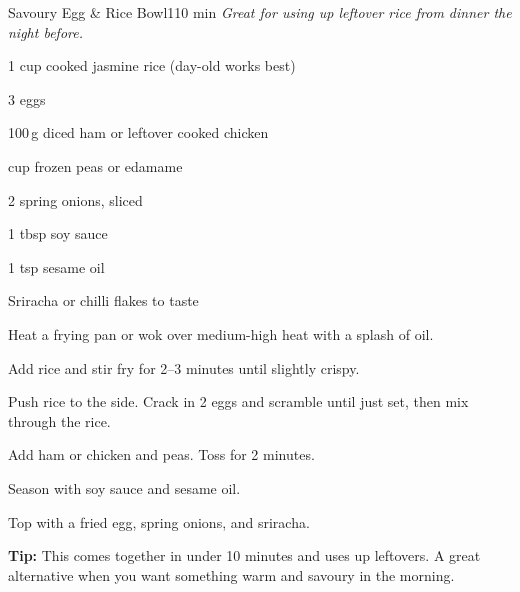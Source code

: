 \begin{recipebox}{Savoury Egg \& Rice Bowl}{1}{10 min}
\textit{Great for using up leftover rice from dinner the night before.}

\begin{ingredients}
  \item 1 cup cooked jasmine rice (day-old works best)
  \item 3 eggs
  \item 100\,g diced ham or leftover cooked chicken
  \item \textonehalf{} cup frozen peas or edamame
  \item 2 spring onions, sliced
  \item 1 tbsp soy sauce
  \item 1 tsp sesame oil
  \item Sriracha or chilli flakes to taste
\end{ingredients}

\begin{method}
  \item Heat a frying pan or wok over medium-high heat with a splash of oil.
  \item Add rice and stir fry for 2--3 minutes until slightly crispy.
  \item Push rice to the side. Crack in 2 eggs and scramble until just set, then mix through the rice.
  \item Add ham or chicken and peas. Toss for 2 minutes.
  \item Season with soy sauce and sesame oil.
  \item Top with a fried egg, spring onions, and sriracha.
\end{method}

\begin{notelist}
  \item \textbf{Tip:} This comes together in under 10 minutes and uses up leftovers. A great alternative when you want something warm and savoury in the morning.
\end{notelist}
\end{recipebox}
